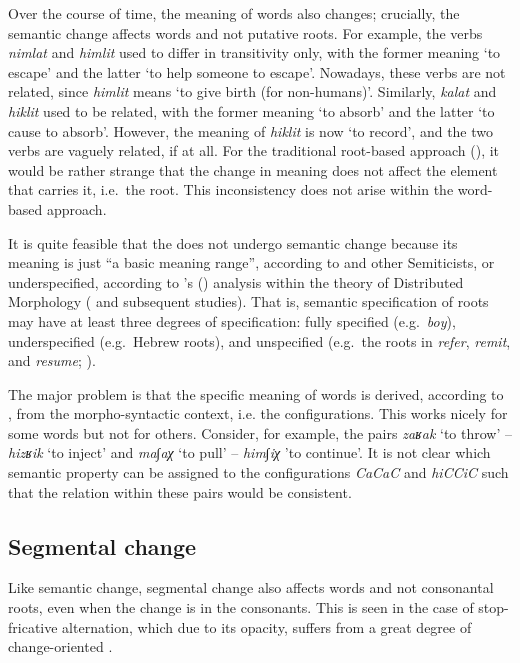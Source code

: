 \documentclass[output=paper,
modfonts
]{LSP/langsci}
\begin{document}
Over the course of time, the meaning of words also changes; crucially,
the semantic change affects words and not putative roots. For example,
the verbs \emph{nimlat} and \emph{himlit} used to differ in transitivity
only, with the former meaning `to escape' and the latter `to help
someone to escape'. Nowadays, these verbs are not related, since
\emph{himlit} means `to give birth (for non-humans)'. Similarly,
\emph{kalat} and \emph{hiklit} used to be related, with the former
meaning `to absorb' and the latter `to cause to absorb'. However, the
meaning of \emph{hiklit} is now `to record', and the two verbs are
vaguely related, if at all. For the traditional root-based approach
(), it would be rather strange that the change in meaning does not
affect the element that carries it, i.e.\ the root. This inconsistency
does not arise within the word-based approach.

It is quite feasible that the  does not undergo semantic change
because its meaning is just ``a basic meaning range'', according to
\citet{moscati1980a} and other Semiticists, or underspecified, according to
\citeauthor{arad2005a}'s (\citeyear{arad2005a}) analysis within the theory of Distributed Morphology
(\citealt{halle1993} and subsequent studies). That is, semantic
specification of roots may have at least three degrees of specification:
fully specified (e.g.\ \emph{boy}), underspecified (e.g.\ Hebrew roots),
and unspecified (e.g.\ the roots in \emph{refer}, \emph{remit}, and
\emph{resume}; \citealt{aronoff1976}).

The major problem is that the specific meaning of words is derived,
according to \citet{arad2005a}, from the morpho-syntactic context, i.e. the
configurations. This works nicely for some words but not for others.
Consider, for example, the pairs \emph{zaʁak} `to throw' --
\emph{hizʁik} `to inject' and \emph{ma∫aχ} `to pull' -- \emph{him∫iχ}
'to continue'. It is not clear which semantic property can be assigned
to the configurations \emph{CaCaC} and \emph{hiCCiC} such that the
relation within these pairs would be consistent.

\subsection{Segmental change}\label{segmental-change}

Like semantic change, segmental change also affects words and not
consonantal roots, even when the change is in the  consonants. This
is seen in the case of stop-fricative alternation, which due to its
opacity, suffers from a great degree of change-oriented  \citep{adam2002a}.
\end{document}

